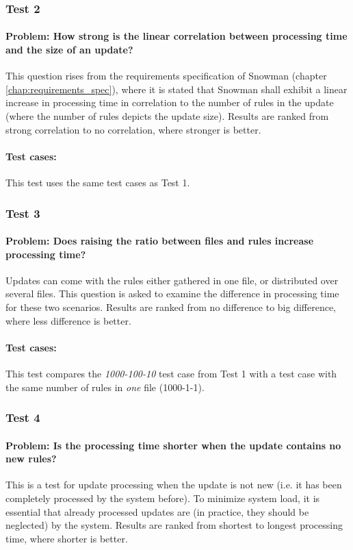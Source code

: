 \subsubsection{Test 2}
\paragraph{Problem: How strong is the linear correlation between processing time
and the size of an update?}
This question rises from the requirements specification of Snowman (chapter
\ref{chap:requirements_spec}), where it is stated that Snowman shall exhibit a
linear increase in processing time in correlation to the number of rules in the
update (where the number of rules depicts the update size). Results are ranked
from strong correlation to no correlation, where stronger is better.
\paragraph{Test cases:}
This test uses the same test cases as Test 1.

\subsubsection{Test 3}
\paragraph{Problem: Does raising the ratio between files and rules increase
processing time?}
Updates can come with the rules either gathered in one file, or distributed over 
several files. This question is asked to examine the difference in processing
time for these two scenarios. Results are ranked from no difference to big
difference, where less difference is better.
\paragraph{Test cases:}
This test compares the \textit{1000-100-10} test case from Test 1 with a
test case with the same number of rules in \textit{one} file (1000-1-1).

\subsubsection{Test 4}
\paragraph{Problem: Is the processing time shorter when the update contains no
new rules?}
This is a test for update processing when the update is not new (i.e. it has
been completely processed by the system before). To minimize system load, it is
essential that already processed updates are (in practice, they should be
neglected) by the system.
Results are ranked from shortest to longest processing time, where shorter is better.
